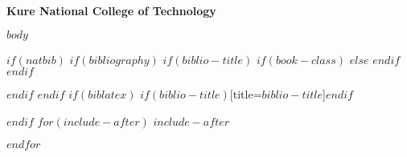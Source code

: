 \documentclass[9pt,a4paper,$if(lang)$$babel-lang$,$endif$]{ltjsarticle}
\begin{document}
\vspace{10mm}

\begin{center}
  \textbf{Kure National College of Technology}
\end{center}

\thispagestyle{empty}
\newpage
\setcounter{page}{1}

\normalsize

$body$

$if(natbib)$
$if(bibliography)$
$if(biblio-title)$
$if(book-class)$
\renewcommand\bibname{$biblio-title$}
$else$
\renewcommand\refname{$biblio-title$}
$endif$
$endif$


$endif$
$endif$
$if(biblatex)$
\printbibliography$if(biblio-title)$[title=$biblio-title$]$endif$

$endif$
$for(include-after)$
$include-after$

$endfor$
\end{document}
